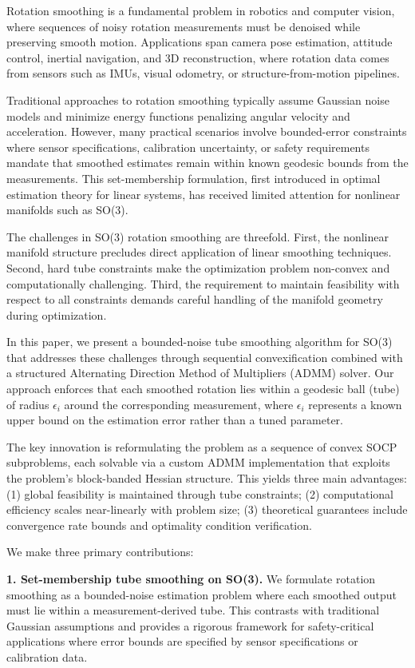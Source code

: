 Rotation smoothing is a fundamental problem in robotics and computer vision, where sequences of noisy rotation measurements must be denoised while preserving smooth motion. Applications span camera pose estimation, attitude control, inertial navigation, and 3D reconstruction, where rotation data comes from sensors such as IMUs, visual odometry, or structure-from-motion pipelines.

Traditional approaches to rotation smoothing typically assume Gaussian noise models and minimize energy functions penalizing angular velocity and acceleration. However, many practical scenarios involve bounded-error constraints where sensor specifications, calibration uncertainty, or safety requirements mandate that smoothed estimates remain within known geodesic bounds from the measurements. This set-membership formulation, first introduced in optimal estimation theory for linear systems, has received limited attention for nonlinear manifolds such as SO(3).

The challenges in SO(3) rotation smoothing are threefold. First, the nonlinear manifold structure precludes direct application of linear smoothing techniques. Second, hard tube constraints make the optimization problem non-convex and computationally challenging. Third, the requirement to maintain feasibility with respect to all constraints demands careful handling of the manifold geometry during optimization.

In this paper, we present a bounded-noise tube smoothing algorithm for SO(3) that addresses these challenges through sequential convexification combined with a structured Alternating Direction Method of Multipliers (ADMM) solver. Our approach enforces that each smoothed rotation lies within a geodesic ball (tube) of radius $\epsilon_i$ around the corresponding measurement, where $\epsilon_i$ represents a known upper bound on the estimation error rather than a tuned parameter.

The key innovation is reformulating the problem as a sequence of convex SOCP subproblems, each solvable via a custom ADMM implementation that exploits the problem's block-banded Hessian structure. This yields three main advantages: (1) global feasibility is maintained through tube constraints; (2) computational efficiency scales near-linearly with problem size; (3) theoretical guarantees include convergence rate bounds and optimality condition verification.

We make three primary contributions:

\textbf{1. Set-membership tube smoothing on SO(3).} We formulate rotation smoothing as a bounded-noise estimation problem where each smoothed output must lie within a measurement-derived tube. This contrasts with traditional Gaussian assumptions and provides a rigorous framework for safety-critical applications where error bounds are specified by sensor specifications or calibration data.

